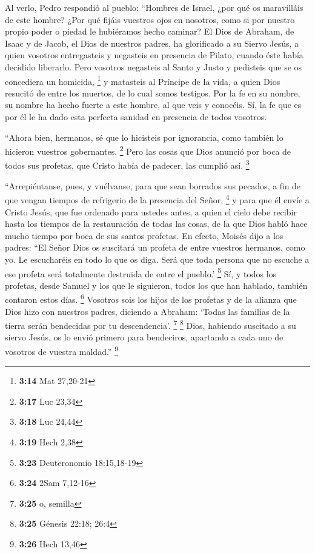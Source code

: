 \begin{paracol}{2}
 Al verlo, Pedro respondió al pueblo: ``Hombres de
Israel, ¿por qué os maravilláis de este hombre? ¿Por qué fijáis vuestros
ojos en nosotros, como si por nuestro propio poder o piedad le
hubiéramos hecho caminar?  El Dios de Abraham, de Isaac y
de Jacob, el Dios de nuestros padres, ha glorificado a su Siervo Jesús,
a quien vosotros entregasteis y negasteis en presencia de Pilato, cuando
éste había decidido liberarlo.  Pero vosotros negasteis
al Santo y Justo y pedisteis que se os concediera un homicida,
\footnote{\textbf{3:14} Mat 27,20-21}  y matasteis al
Príncipe de la vida, a quien Dios resucitó de entre los muertos, de lo
cual somos testigos.  Por la fe en su nombre, su nombre
ha hecho fuerte a este hombre, al que veis y conocéis. Sí, la fe que es
por él le ha dado esta perfecta sanidad en presencia de todos vosotros.

 ``Ahora bien, hermanos, sé que lo hicisteis por
ignorancia, como también lo hicieron vuestros gobernantes. \footnote{\textbf{3:17}
  Luc 23,34}  Pero las cosas que Dios anunció por boca de
todos sus profetas, que Cristo había de padecer, las cumplió así.
\footnote{\textbf{3:18} Luc 24,44}

 ``Arrepiéntanse, pues, y vuélvanse, para que sean
borrados sus pecados, a fin de que vengan tiempos de refrigerio de la
presencia del Señor, \footnote{\textbf{3:19} Hech 2,38} 
y para que él envíe a Cristo Jesús, que fue ordenado para ustedes antes,
 a quien el cielo debe recibir hasta los tiempos de la
restauración de todas las cosas, de la que Dios habló hace mucho tiempo
por boca de sus santos profetas.  En efecto, Moisés dijo
a los padres: ``El Señor Dios os suscitará un profeta de entre vuestros
hermanos, como yo. Le escucharéis en todo lo que os diga.
 Será que toda persona que no escuche a ese profeta será
totalmente destruida de entre el pueblo.' \footnote{\textbf{3:23}
  Deuteronomio 18:15,18-19}  Sí, y todos los profetas,
desde Samuel y los que le siguieron, todos los que han hablado, también
contaron estos días. \footnote{\textbf{3:24} 2Sam 7,12-16}
 Vosotros sois los hijos de los profetas y de la alianza
que Dios hizo con nuestros padres, diciendo a Abraham: `Todas las
familias de la tierra serán bendecidas por tu descendencia'. \footnote{\textbf{3:25}
  o, semilla} \footnote{\textbf{3:25} Génesis 22:18; 26:4}
 Dios, habiendo suscitado a su siervo Jesús, os lo envió
primero para bendeciros, apartando a cada uno de vosotros de vuestra
maldad.'' \footnote{\textbf{3:26} Hech 13,46}


\end{paracol}
